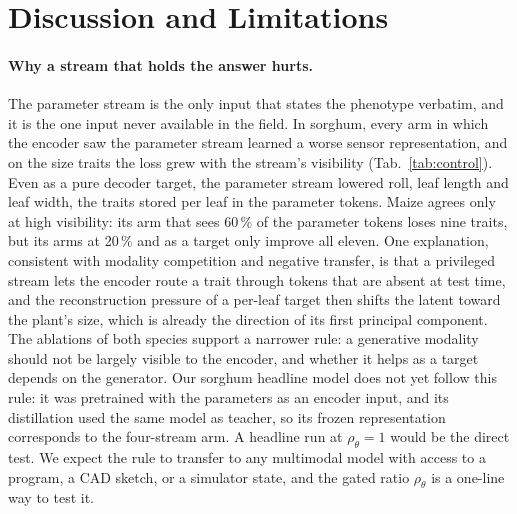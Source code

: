 \providecommand{\CropCode}{\textsc{CropCode}}
\providecommand{\FieldProc}{\textsc{FieldScan}}
\providecommand{\todo}[1]{\textcolor{red}{#1}}

\section{Discussion and Limitations}
\label{sec:discussion}

\paragraph{Why a stream that holds the answer hurts.}
The parameter stream is the only input that states the phenotype verbatim, and
it is the one input never available in the field. In sorghum, every arm in which
the encoder saw the parameter stream learned a worse sensor representation, and
on the size traits the loss grew with the stream's visibility
(Tab.~\ref{tab:control}). Even as a pure decoder target, the parameter stream
lowered roll, leaf length and leaf width, the traits stored per leaf in the
parameter tokens. Maize agrees only at high visibility: its arm that sees
60\,\% of the parameter tokens loses nine traits, but its arms at 20\,\% and
as a target only improve all eleven. One
explanation, consistent with modality competition and negative transfer, is that
a privileged stream lets the encoder route a trait through tokens that are
absent at test time, and the reconstruction pressure of a per-leaf target then
shifts the latent toward the plant's size, which is already the direction of its
first principal component. The ablations of both species support a narrower
rule: a generative modality should not be largely visible to the encoder, and
whether it helps as a target depends on the generator. Our sorghum headline
model does not yet follow this rule: it was pretrained with the
parameters as an encoder input, and its distillation used the same model as
teacher, so its frozen representation corresponds to the four-stream arm. A
headline run at $\rho_\theta{=}1$ would be the direct test. We expect the rule
to transfer to any multimodal model with access to a program, a CAD sketch, or a
simulator state, and the gated ratio $\rho_\theta$ is a one-line way to test
it.

